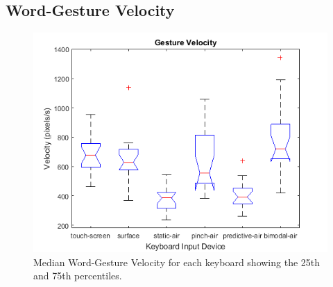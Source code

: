 \subsection{Word-Gesture Velocity}
\begin{figure}[h]
	\centering
	\includegraphics{fig_velocity_gesture_boxplot}
	\caption[Word-Gesture Velocity Boxplot]{Median Word-Gesture Velocity for each keyboard showing the 25th and 75th percentiles.}
	\label{fig_velocity_gesture_boxplot}
\end{figure}

